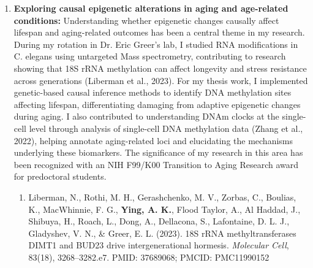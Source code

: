 \documentclass{nihbiosketch}
\begin{document}
\begin{enumerate}
\begin{enumerate}
\item Yang, Z., Macdonald-Dunlop, E., Chen, J., Zhai, R., Li, T., Richmond, A., Klarić, L., Pirastu, N., Ning, Z., Zheng, C., Wang, Y., Huang, T., He, Y., Guo, H., \textbf{Ying, K.}, Gustafsson, S., ... Shen, X. (2022). Genetic Landscape of the ACE2 Coronavirus Receptor. \textit{Circulation}, 145(18), 1398--1411. PMID: 35387486; PMCID: PMC9047645

\item Castro, J. P., Shindyapina, A. V., Barbieri, A., \textbf{Ying, K.}, Strelkova, O. S., Paulo, J. A., Tyshkovskiy, A., Meinl, R., Kerepesi, C., Petrashen, A. P., Mariotti, M., Meer, M. V., Hu, Y., Karamyshev, A., Losyev, G., Galhardo, M., Logarinho, E., Indzhykulian, A. A., Gygi, S. P., ... Gladyshev, V. N. (2024). Age-associated clonal B cells drive B cell lymphoma in mice. \textit{Nature Aging}, 4(10), 1403--1417. PMID: 39117982

\end{enumerate}


\item \textbf{Exploring causal epigenetic alterations in aging and age-related conditions:} 
Understanding whether epigenetic changes causally affect lifespan and aging-related outcomes has been a central theme in my research. During my rotation in Dr. Eric Greer's lab, I studied RNA modifications in C. elegans using untargeted Mass spectrometry, contributing to research showing that 18S rRNA methylation can affect longevity and stress resistance across generations (Liberman et al., 2023). For my thesis work, I implemented genetic-based causal inference methods to identify DNA methylation sites affecting lifespan, differentiating damaging from adaptive epigenetic changes during aging. I also contributed to understanding DNAm clocks at the single-cell level through analysis of single-cell DNA methylation data (Zhang et al., 2022), helping annotate aging-related loci and elucidating the mechanisms underlying these biomarkers. The significance of my research in this area has been recognized with an NIH F99/K00 Transition to Aging Research award for predoctoral students.

\begin{enumerate}

\item Liberman, N., Rothi, M. H., Gerashchenko, M. V., Zorbas, C., Boulias, K., MacWhinnie, F. G., \textbf{Ying, A. K.}, Flood Taylor, A., Al Haddad, J., Shibuya, H., Roach, L., Dong, A., Dellacona, S., Lafontaine, D. L. J., Gladyshev, V. N., \& Greer, E. L. (2023). 18S rRNA methyltransferases DIMT1 and BUD23 drive intergenerational hormesis. \textit{Molecular Cell}, 83(18), 3268--3282.e7. PMID: 37689068; PMCID: PMC11990152


\end{enumerate}
\end{enumerate}
\end{document}
